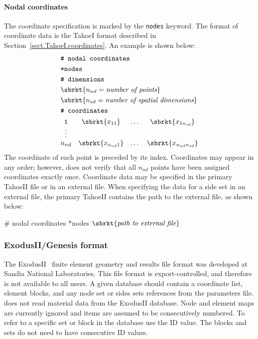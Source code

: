 \paragraph{Nodal coordinates}
The coordinate specification is marked by the \texttt{nodes} keyword.
The format of coordinate data is the TahoeI format described in 
Section~\ref{sect.TahoeI.coordinates}.
An example is shown below:
\begin{align}
& \texttt{\# nodal coordinates} \notag \\
& \texttt{*nodes} \notag \\
& \texttt{\# dimensions} \notag \\
& \sbrkt{n_{nd} = \textit{number of points}} \notag \\
& \sbrkt{n_{sd} = \textit{number of spatial dimensions}} \notag \\
& \texttt{\# coordinates} \notag \\
& \begin{matrix}
\texttt{1} & \sbrkt{x_{11}} & \dots  & \sbrkt{x_{1n_{sd}}} \\
\vdots \\
n_{nd} & \sbrkt{x_{n_{nd}1}} & \dots & \sbrkt{x_{n_{nd}n_{sd}}}
\end{matrix} \notag
\end{align}
The coordinate of each point is preceded by its index. Coordinates 
may appear in any order; however, \tahoe does not verify that all 
$n_{nd}$ points have been assigned coordinates exactly once.
Coordinate data may be specified in the primary TahoeII file or in an 
external file.
When specifying the data for a side set in an external file, the 
primary TahoeII contains the path to the external file, as shown below:
\begin{inputfile}
# nodal coordinates	
*nodes \(\sbrkt{\textrm{\textit{path to external file}}}\)
\end{inputfile}

\subsubsection{\textsf{ExodusII/Genesis} format}
\label{sect.file.exodusII}
The \textsf{ExodusII}~\cite{ExodusII} finite element geometry and results file 
format was developed at Sandia National Laboratories. This file format 
is export-controlled, and therefore is not available to all users.
A given database should contain a coordinate list, element blocks,
and any node set or sides sets references from the 
parameters file.  \tahoe does not read material data from the 
\textsf{ExodusII} database. 
Node and element maps are currently ignored and items are assumed to be
consecutively numbered.  To refer to a specific set or block in the
database use the ID value.  The blocks and sets do not need to have
consecutive ID values.


